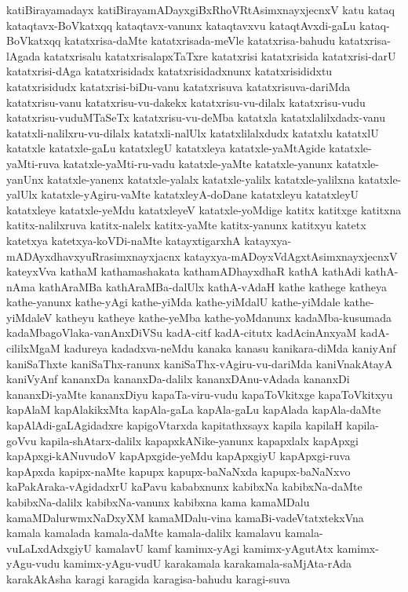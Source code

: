 {katiBirayamadayx
katiBirayamADayxgiBxRhoVRtAsimxnayxjecnxV
katu
kataq
kataqtavx-BoVkatxqq
kataqtavx-vanunx
kataqtavxvu
kataqtAvxdi-gaLu
kataq-BoVkatxqq
katatxrisa-daMte
katatxrisada-meVle
katatxrisa-bahudu
katatxrisa-lAgada
katatxrisalu
katatxrisalapxTaTxre
katatxrisi
katatxrisida
katatxrisi-darU
katatxrisi-dAga
katatxrisidadx
katatxrisidadxnunx
katatxrisididxtu
katatxrisidudx
katatxrisi-biDu-vanu
katatxrisuva
katatxrisuva-dariMda
katatxrisu-vanu
katatxrisu-vu-dakekx
katatxrisu-vu-dilalx
katatxrisu-vudu
katatxrisu-vuduMTaSeTx
katatxrisu-vu-deMba
katatxla
katatxlalilxdadx-vanu
katatxli-nalilxru-vu-dilalx
katatxli-nalUlx
katatxlilalxdudx
katatxlu
katatxlU
katatxle
katatxle-gaLu
katatxlegU
katatxleya
katatxle-yaMtAgide
katatxle-yaMti-ruva
katatxle-yaMti-ru-vadu
katatxle-yaMte
katatxle-yanunx
katatxle-yanUnx
katatxle-yanenx
katatxle-yalalx
katatxle-yalilx
katatxle-yalilxna
katatxle-yalUlx
katatxle-yAgiru-vaMte
katatxleyA-doDane
katatxleyu
katatxleyU
katatxleye
katatxle-yeMdu
katatxleyeV
katatxle-yoMdige
katitx
katitxge
katitxna
katitx-nalilxruva
katitx-nalelx
katitx-yaMte
katitx-yanunx
katitxyu
katetx
katetxya
katetxya-koVDi-naMte
katayxtigarxhA
katayxya-mADAyxdhavxyuRrasimxnayxjacnx
katayxya-mADoyxVdAgxtAsimxnayxjecnxV
kateyxVva
kathaM
kathamashakata
kathamADhayxdhaR
kathA
kathAdi
kathA-nAma
kathAraMBa
kathAraMBa-dalUlx
kathA-vAdaH
kathe
kathege
katheya
kathe-yanunx
kathe-yAgi
kathe-yiMda
kathe-yiMdalU
kathe-yiMdale
kathe-yiMdaleV
katheyu
katheye
kathe-yeMba
kathe-yoMdanunx
kadaMba-kusumada
kadaMbagoVlaka-vanAnxDiVSu
kadA-citf
kadA-citutx
kadAcinAnxyaM
kadA-cililxMgaM
kadureya
kadadxva-neMdu
kanaka
kanasu
kanikara-diMda
kaniyAnf
kaniSaThxte
kaniSaThx-ranunx
kaniSaThx-vAgiru-vu-dariMda
kaniVnakAtayA
kaniVyAnf
kananxDa
kananxDa-dalilx
kananxDAnu-vAdada
kananxDi
kananxDi-yaMte
kananxDiyu
kapaTa-viru-vudu
kapaToVkitxge
kapaToVkitxyu
kapAlaM
kapAlakikxMta
kapAla-gaLa
kapAla-gaLu
kapAlada
kapAla-daMte
kapAlAdi-gaLAgidadxre
kapigoVtarxda
kapitathxsayx
kapila
kapilaH
kapila-goVvu
kapila-shAtarx-dalilx
kapapxkANike-yanunx
kapapxlalx
kapApxgi
kapApxgi-kANuvudoV
kapApxgide-yeMdu
kapApxgiyU
kapApxgi-ruva
kapApxda
kapipx-naMte
kapupx
kapupx-baNaNxda
kapupx-baNaNxvo
kaPakAraka-vAgidadxrU
kaPavu
kababxnunx
kabibxNa
kabibxNa-daMte
kabibxNa-dalilx
kabibxNa-vanunx
kabibxna
kama
kamaMDalu
kamaMDalurwmxNaDxyXM
kamaMDalu-vina
kamaBi-vadeVtatxtekxVna
kamala
kamalada
kamala-daMte
kamala-dalilx
kamalavu
kamala-vuLaLxdAdxgiyU
kamalavU
kamf
kamimx-yAgi
kamimx-yAgutAtx
kamimx-yAgu-vudu
kamimx-yAgu-vudU
karakamala
karakamala-saMjAta-rAda
karakAkAsha
karagi
karagida
karagisa-bahudu
karagi-suva
}
